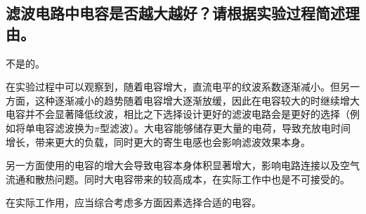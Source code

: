 \documentclass[10pt,a4paper]{article}	%
\begin{document}
		\subsection{滤波电路中电容是否越大越好？请根据实验过程简述理由。}

		不是的。

		在实验过程中可以观察到，随着电容增大，直流电平的纹波系数逐渐减小。但另一方面，这种逐渐减小的趋势随着电容增大逐渐放缓，因此在电容较大的时继续增大电容并不会显著降低纹波，相比之下选择设计更好的滤波电路会是更好的选择（例如将单电容滤波换为$\pi$型滤波）。大电容能够储存更大量的电荷，导致充放电时间增长，带来更大的负载，同时更大的寄生电感也会影响滤波效果本身。
		
		另一方面使用的电容的增大会导致电容本身体积显著增大，影响电路连接以及空气流通和散热问题。同时大电容带来的较高成本，在实际工作中也是不可接受的。
	
		在实际工作用，应当综合考虑多方面因素选择合适的电容。
\end{document}
